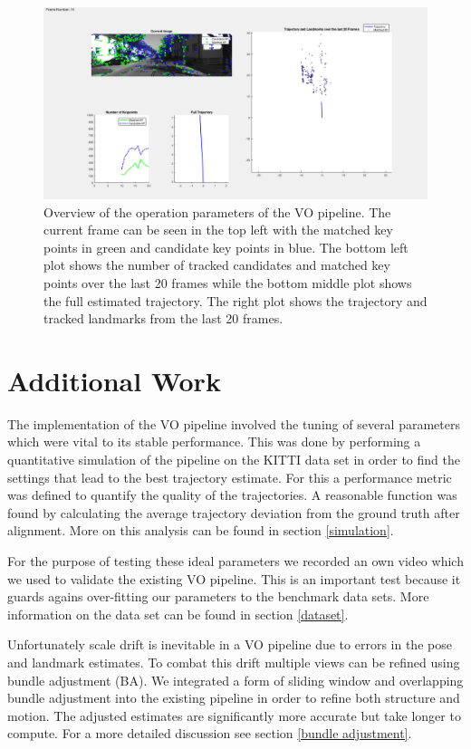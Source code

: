 \begin{figure}[H]
  \centering
    \includegraphics[width=\textwidth]{figures/overview}
  \caption{Overview of the operation parameters of the VO pipeline. 
  The current frame can be seen in the top left with the matched key points in green and candidate key points in blue. 
  The bottom left plot shows the number of tracked candidates and matched key points over the last 20 frames while the bottom middle plot shows the full estimated trajectory. 
  The right plot shows the trajectory and tracked landmarks from the last 20 frames.}
  \label{fig:overview}
\end{figure}

\section{Additional Work}
\label{additionalWork}
The implementation of the VO pipeline involved the tuning of several parameters which were vital to its stable performance. 
This was done by performing a quantitative simulation of the pipeline on the KITTI data set in order to find the settings that lead to the best trajectory estimate. 
For this a performance metric was defined to quantify the quality of the trajectories. A reasonable function was found by calculating the average trajectory deviation from the ground truth after alignment. 
More on this analysis can be found in section \ref{simulation}. \par
For the purpose of testing these ideal parameters we recorded an own video which we used to validate the existing VO pipeline. 
This is an important test because it guards agains over-fitting our parameters to the benchmark data sets. 
More information on the data set can be found in section \ref{dataset}. \par
Unfortunately scale drift is inevitable in a VO pipeline due to errors in the pose and landmark estimates. 
To combat this drift multiple views can be refined using bundle adjustment (BA). 
We integrated a form of sliding window and overlapping bundle adjustment into the existing pipeline in order to refine both structure and motion. 
The adjusted estimates are significantly more accurate but take longer to compute. 
For a more detailed discussion see section \ref{bundle adjustment}.